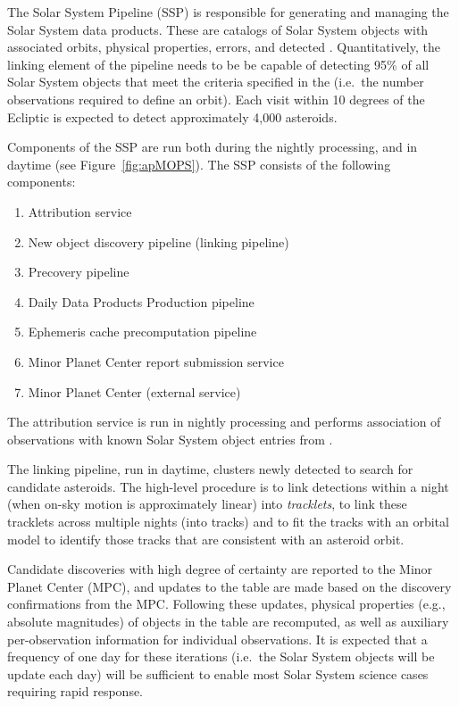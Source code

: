 The Solar System Pipeline (SSP) is responsible for generating and managing the Solar System data products. These are catalogs of Solar System objects with associated orbits, physical properties, errors, and detected \DIASources. Quantitatively, the linking element of the pipeline needs to be be capable of detecting 95\%  of all Solar System objects that meet the criteria specified in the \OSS\@ {} (i.e.\ the number observations required to define an orbit). Each visit within 10 degrees of the Ecliptic is expected to detect approximately 4,000 asteroids.

Components of the SSP are run both during the nightly processing, and in daytime (see Figure~\ref{fig:apMOPS}). The SSP consists of the following components:
%
\begin{enumerate}
	\item Attribution service
	\item New object discovery pipeline (linking pipeline)
	\item Precovery pipeline
	\item Daily Data Products Production pipeline
	\item Ephemeris cache precomputation pipeline
	\item Minor Planet Center report submission service
	\item Minor Planet Center (external service)
\end{enumerate}
%
The attribution service is run in nightly processing and performs association of observations with known Solar System object entries from \MPCORB.

The linking pipeline, run in daytime, clusters newly detected \DIAObjects to search for candidate asteroids. The high-level procedure is to link \DIASource detections within a night (when on-sky motion is approximately linear) into {\em tracklets}, to link these tracklets across multiple nights (into tracks) and to fit the tracks with an orbital model to identify those tracks that are consistent with an asteroid orbit.

Candidate discoveries with high degree of certainty are reported to the Minor Planet Center (MPC), and updates to the \MPCORB table are made based on the discovery confirmations from the MPC. Following these updates, physical properties (e.g., absolute magnitudes) of objects in the \SSObject table are recomputed, as well as auxiliary per-observation information for individual observations. It is expected that a frequency of one day for these iterations (i.e.\ the Solar System objects will be update each day) will be sufficient to enable most Solar System science cases requiring rapid response.

